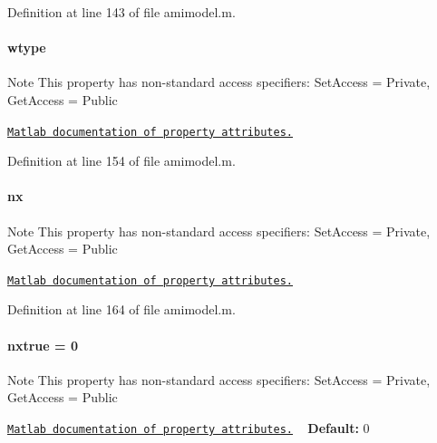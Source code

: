 Definition at line 143 of file amimodel.\+m.

\hypertarget{classamimodel_a5376250224ce32fb558d88aa0b5a93ff}{}
\paragraph[{wtype}]{\setlength{\rightskip}{0pt plus 5cm}wtype}\label{classamimodel_a5376250224ce32fb558d88aa0b5a93ff}
\begin{DoxyNote}{Note}
This property has non-\/standard access specifiers\+: {\ttfamily Set\+Access = Private, Get\+Access = Public} 

\href{http://www.mathworks.com/help/matlab/matlab_oop/property-attributes.html}{\tt Matlab documentation of property attributes.} 
\end{DoxyNote}


Definition at line 154 of file amimodel.\+m.

\hypertarget{classamimodel_a84e4236f07668a770c27567f1f9615ff}{}
\paragraph[{nx}]{\setlength{\rightskip}{0pt plus 5cm}nx}\label{classamimodel_a84e4236f07668a770c27567f1f9615ff}
\begin{DoxyNote}{Note}
This property has non-\/standard access specifiers\+: {\ttfamily Set\+Access = Private, Get\+Access = Public} 

\href{http://www.mathworks.com/help/matlab/matlab_oop/property-attributes.html}{\tt Matlab documentation of property attributes.} 
\end{DoxyNote}


Definition at line 164 of file amimodel.\+m.

\hypertarget{classamimodel_a49c476de14a021114feb8c95da04952a}{}
\paragraph[{nxtrue}]{\setlength{\rightskip}{0pt plus 5cm}nxtrue = 0}\label{classamimodel_a49c476de14a021114feb8c95da04952a}
\begin{DoxyNote}{Note}
This property has non-\/standard access specifiers\+: {\ttfamily Set\+Access = Private, Get\+Access = Public} 

\href{http://www.mathworks.com/help/matlab/matlab_oop/property-attributes.html}{\tt Matlab documentation of property attributes.} ~\newline
{\bfseries Default\+:} 0 
\end{DoxyNote}


